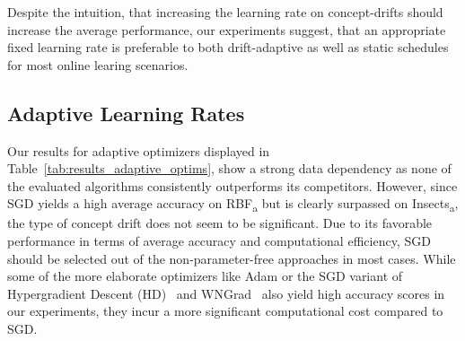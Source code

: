 \documentclass{article} %
\begin{document}
Despite the intuition, that increasing the learning rate on concept-drifts should increase the average performance, our experiments suggest, that an appropriate fixed learning rate is preferable to both drift-adaptive as well as static schedules for most online learing scenarios.

\subsection{Adaptive Learning Rates}

Our results for adaptive optimizers displayed in Table~\ref{tab:results_adaptive_optims}, show a strong data dependency as none of the evaluated algorithms consistently outperforms its competitors.
However, since SGD yields a high average accuracy on RBF\textsubscript{a} but is clearly surpassed on Insects\textsubscript{a}, the type of concept drift does not seem to be significant.
Due to its favorable performance in terms of average accuracy and computational efficiency, SGD should be selected out of the non-parameter-free approaches in most cases.
While some of the more elaborate optimizers like Adam or the SGD variant of Hypergradient Descent (HD)~\citep{baydinOnlineLearningRate2018} and WNGrad~\citep{wuWNGradLearnLearning2020} also yield high accuracy scores in our experiments, they incur a more significant computational cost compared to SGD.
\end{document}
